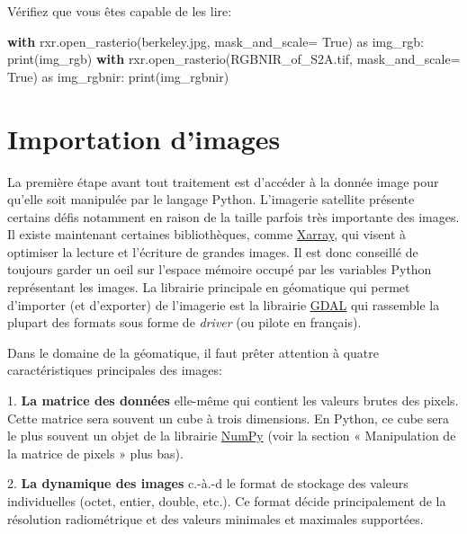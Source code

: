 \documentclass[
  french,
  11pt,
  letterpaper,
  open=any,
  twoside=false,
  french]{scrbook}
\newenvironment{Shaded}{\begin{snugshade}}{\end{snugshade}}
\newcommand{\BuiltInTok}[1]{\textcolor[rgb]{0.00,0.23,0.31}{#1}}
\newcommand{\ControlFlowTok}[1]{\textcolor[rgb]{0.00,0.23,0.31}{\textbf{#1}}}
\newcommand{\ImportTok}[1]{\textcolor[rgb]{0.00,0.46,0.62}{#1}}
\newcommand{\NormalTok}[1]{\textcolor[rgb]{0.00,0.23,0.31}{#1}}
\newcommand{\OperatorTok}[1]{\textcolor[rgb]{0.37,0.37,0.37}{#1}}
\newcommand{\StringTok}[1]{\textcolor[rgb]{0.13,0.47,0.30}{#1}}
\newcommand{\VariableTok}[1]{\textcolor[rgb]{0.07,0.07,0.07}{#1}}
\begin{document}
Vérifiez que vous êtes capable de les lire:

\begin{Shaded}
\begin{Highlighting}[]
\ControlFlowTok{with}\NormalTok{ rxr.open\_rasterio(}\StringTok{\textquotesingle{}berkeley.jpg\textquotesingle{}}\NormalTok{, mask\_and\_scale}\OperatorTok{=} \VariableTok{True}\NormalTok{) }\ImportTok{as}\NormalTok{ img\_rgb:}
    \BuiltInTok{print}\NormalTok{(img\_rgb)}
\ControlFlowTok{with}\NormalTok{ rxr.open\_rasterio(}\StringTok{\textquotesingle{}RGBNIR\_of\_S2A.tif\textquotesingle{}}\NormalTok{, mask\_and\_scale}\OperatorTok{=} \VariableTok{True}\NormalTok{) }\ImportTok{as}\NormalTok{ img\_rgbnir:}
    \BuiltInTok{print}\NormalTok{(img\_rgbnir)}
\end{Highlighting}
\end{Shaded}

\section{Importation d'images}\label{importation-dimages}

La première étape avant tout traitement est d'accéder à la donnée image
pour qu'elle soit manipulée par le langage Python. L'imagerie satellite
présente certains défis notamment en raison de la taille parfois très
importante des images. Il existe maintenant certaines bibliothèques,
comme \href{https://docs.xarray.dev/en/stable/}{Xarray}, qui visent à
optimiser la lecture et l'écriture de grandes images. Il est donc
conseillé de toujours garder un oeil sur l'espace mémoire occupé par les
variables Python représentant les images. La librairie principale en
géomatique qui permet d'importer (et d'exporter) de l'imagerie est la
librairie \href{https://gdal.org}{GDAL} qui rassemble la plupart des
formats sous forme de \emph{driver} (ou pilote en français).

Dans le domaine de la géomatique, il faut prêter attention à quatre
caractéristiques principales des images:

1. \textbf{La matrice des données} elle-même qui contient les valeurs
brutes des pixels. Cette matrice sera souvent un cube à trois
dimensions. En Python, ce cube sera le plus souvent un objet de la
librairie \href{https://numpy.org/}{NumPy} (voir la section «
Manipulation de la matrice de pixels » plus bas).

2. \textbf{La dynamique des images} c.-à.-d le format de stockage des
valeurs individuelles (octet, entier, double, etc.). Ce format décide
principalement de la résolution radiométrique et des valeurs minimales
et maximales supportées.
\end{document}
